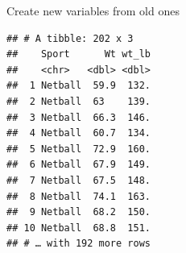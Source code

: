 \documentclass[ignorenonframetext,]{beamer}
\newenvironment{Shaded}{\begin{snugshade}}{\end{snugshade}}
\newcommand{\DataTypeTok}[1]{\textcolor[rgb]{0.13,0.29,0.53}{#1}}
\newcommand{\FloatTok}[1]{\textcolor[rgb]{0.00,0.00,0.81}{#1}}
\newcommand{\KeywordTok}[1]{\textcolor[rgb]{0.13,0.29,0.53}{\textbf{#1}}}
\newcommand{\NormalTok}[1]{#1}
\newcommand{\OperatorTok}[1]{\textcolor[rgb]{0.81,0.36,0.00}{\textbf{#1}}}
\newcommand{\StringTok}[1]{\textcolor[rgb]{0.31,0.60,0.02}{#1}}
\begin{document}
\begin{frame}[fragile]{Create new variables from old ones}
\protect\hypertarget{create-new-variables-from-old-ones}{}

\begin{Shaded}
\end{Shaded}

\begin{verbatim}
## # A tibble: 202 x 3
##    Sport      Wt wt_lb
##    <chr>   <dbl> <dbl>
##  1 Netball  59.9  132.
##  2 Netball  63    139.
##  3 Netball  66.3  146.
##  4 Netball  60.7  134.
##  5 Netball  72.9  160.
##  6 Netball  67.9  149.
##  7 Netball  67.5  148.
##  8 Netball  74.1  163.
##  9 Netball  68.2  150.
## 10 Netball  68.8  151.
## # … with 192 more rows
\end{verbatim}

\end{frame}
\end{document}
